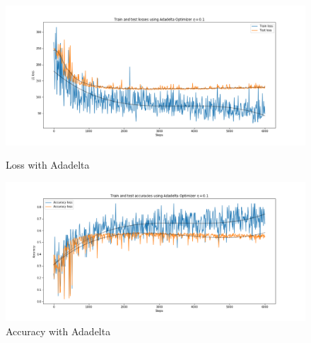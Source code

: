 \documentclass{article}
\begin{document}
\begin{figure}[ht] 
  \begin{minipage}[b]{0.5\linewidth}
    \centering
    \includegraphics[width=1.1\linewidth]{loss_adadel.png} 
    \caption{Loss with Adadelta} 
  \end{minipage}
  \begin{minipage}[b]{0.5\linewidth}
    \centering
    \includegraphics[width=1.1\linewidth]{acc_adadel.png} 
    \caption{Accuracy with Adadelta}
  \end{minipage} 
\end{figure}
\end{document}
